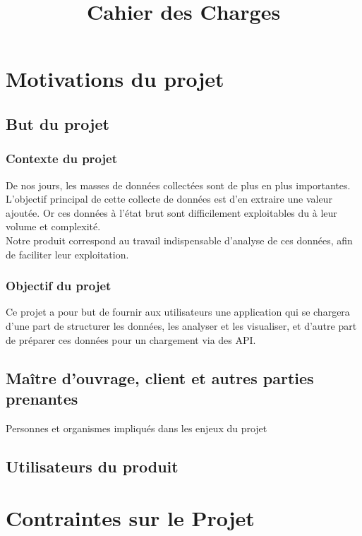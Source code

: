 

\title{\textbf{\Huge Cahier des Charges}\vspace{-2ex}}


\maketitle
\vspace{4ex}
\tableofcontents
\newpage

	\section{Motivations du projet}
		\subsection{But du projet}
			\subsubsection{Contexte du projet}
			De nos jours, les masses de données collectées sont de plus en plus importantes. L'objectif principal de cette collecte de données est d'en extraire une valeur ajoutée. Or ces données à l'état brut sont difficilement exploitables du à leur volume et complexité.\\
			Notre produit correspond au travail indispensable d'analyse de ces données, afin de faciliter leur exploitation.
			\subsubsection{Objectif du projet}
			Ce projet a pour but de fournir aux utilisateurs une application qui se chargera d'une part de structurer les données, les analyser et les visualiser, et d'autre part de préparer ces données pour un chargement via des API.
		
		
		\subsection{Maître d'ouvrage, client et autres parties prenantes}
			{\color{red}Personnes et organismes impliqués dans les enjeux du projet}
			
		\subsection{Utilisateurs du produit}
		
	\section{Contraintes sur le Projet}
